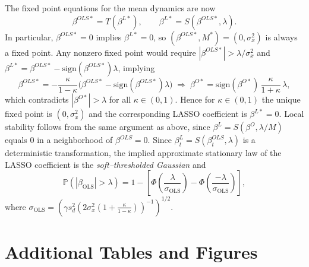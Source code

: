 \documentclass[11pt]{article}
\begin{document}
The fixed point equations for the mean dynamics are now
\[
\beta^{OLS*}=T(\beta^{L*}),\qquad \beta^{L*}=S(\beta^{OLS*},\lambda).
\]
In particular, $\beta^{OLS*}=0$ implies $\beta^{L*}=0$, so $(\beta^{OLS*},M^*)=(0,\sigma_x^2)$ is always a fixed point. Any nonzero fixed point would require $|\beta^{OLS*}|>\lambda/\sigma_x^2$ and $\beta^{L*}=\beta^{OLS*}-\mathrm{sign}(\beta^{OLS*})\lambda$, implying
\[
\beta^{OLS*}=-\frac{\kappa}{1-\kappa}\Big(\beta^{OLS*}-\mathrm{sign}(\beta^{OLS*})\lambda\Big)
\;\Rightarrow\;
\beta^{O*}=\mathrm{sign}(\beta^{O*})\,\frac{\kappa}{1+\kappa}\,\lambda,
\]
which contradicts $|\beta^{O*}|>\lambda$ for all $\kappa\in(0,1)$. Hence for $\kappa\in(0,1)$ the unique fixed point is $(0,\sigma_x^2)$ and the corresponding LASSO coefficient is $\beta^{L*}=0$. 
Local stability follows from the same argument as above, since $\beta^{L}=S(\beta^{O},\lambda/M)$ equals $0$ in a neighborhood of $\beta^{OLS}=0$.
Since $\beta^L_t=S(\beta^{OLS}_t,\lambda)$ is a deterministic transformation, the implied approximate stationary law of the LASSO coefficient is the \emph{soft--thresholded Gaussian} and 
\[ \mathbb{P}(|{\beta}_{\text{OLS}}| > \lambda) = 1 - \left[\Phi\left(\frac{\lambda}{\sigma_{\text{OLS}}}\right) - \Phi\left(\frac{-\lambda}{\sigma_{\text{OLS}}}\right)\right], \]
where $\sigma_{\text{OLS}} = \left(\gamma s_{d}^2 \left(2 \sigma^2_x \left(1 + \frac{\kappa}{1 - \kappa} \right)\right)^{-1}\right)^{1/2}$.

\section{Additional Tables and Figures}\label{app:tab_figures}

\begingroup
\footnotesize  %
\setlength{\tabcolsep}{3pt}  %
\renewcommand{\arraystretch}{1.0}  %
\end{document}
